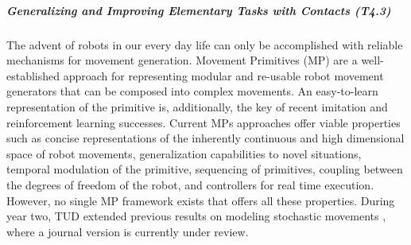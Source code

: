 \subparagraph{Generalizing and Improving Elementary Tasks with Contacts (T4.3)}%

The advent of robots in our every day life can only be accomplished with
reliable mechanisms for movement generation.  Movement Primitives (MP) are a
well-established approach for representing modular and re-usable robot movement
generators that can be composed into complex movements.  An easy-to-learn
representation of the primitive is, additionally, the key of recent imitation
and reinforcement learning successes. Current MPs approaches offer viable
properties such as concise representations of the inherently continuous and
high dimensional space of robot movements, generalization capabilities to novel
situations, temporal modulation of the primitive, sequencing of primitives,
coupling between the degrees of freedom of the robot, and controllers for real
time execution. However, no single MP framework exists that offers all these
properties.  During year two, TUD extended previous results on modeling stochastic movements \cite{Paraschos2013,Paraschos2013a}, where a journal version is currently under review. 


\newcommand{\hockeyImLabel}[3]{%
\begin{tikzpicture}
\node[  anchor=south west,inner sep=0,%
        draw=gray,%
] (image) at (0,0){
\texttt{[image: \#1]}};
\begin{scope}[x={(image.south east)},y={(image.north west)}]
    \node [fill=white,opacity=0.6,above right,font=\large] at (0.01,0.01) {#2};
    \node [fill=white,opacity=0.6,below left,font=\large] at (0.99,0.99) {#3};
\end{scope}
\begin{scope}[x={(image.south east)},%
              y={(image.north west)},%
              on background layer]
    \path[outer color=light-gray,inner color=white] (0,0) rectangle (1,1);
    \draw[gray,opacity=0.15,xstep=.1,ystep=.1] (0,0) grid (1,1);
\end{scope}
\end{tikzpicture}%
}

